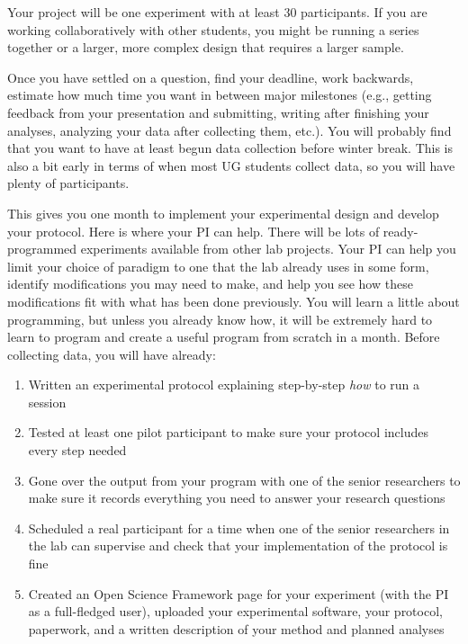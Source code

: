 \documentclass[12pt,]{book}
\providecommand{\tightlist}{%
  \setlength{\itemsep}{0pt}\setlength{\parskip}{0pt}}
\theoremstyle{definition}
\theoremstyle{definition}
\theoremstyle{definition}
\theoremstyle{remark}
\begin{document}
Your project will be one experiment with at least 30 participants. If
you are working collaboratively with other students, you might be
running a series together or a larger, more complex design that requires
a larger sample.

Once you have settled on a question, find your deadline, work backwards,
estimate how much time you want in between major milestones (e.g.,
getting feedback from your presentation and submitting, writing after
finishing your analyses, analyzing your data after collecting them,
etc.). You will probably find that you want to have at least begun data
collection before winter break. This is also a bit early in terms of
when most UG students collect data, so you will have plenty of
participants.

This gives you one month to implement your experimental design and
develop your protocol. Here is where your PI can help. There will be
lots of ready-programmed experiments available from other lab projects.
Your PI can help you limit your choice of paradigm to one that the lab
already uses in some form, identify modifications you may need to make,
and help you see how these modifications fit with what has been done
previously. You will learn a little about programming, but unless you
already know how, it will be extremely hard to learn to program and
create a useful program from scratch in a month. Before collecting data,
you will have already:

\begin{enumerate}
\def\labelenumi{\arabic{enumi}.}
\tightlist
\item
  Written an experimental protocol explaining step-by-step \emph{how} to
  run a session
\item
  Tested at least one pilot participant to make sure your protocol
  includes every step needed
\item
  Gone over the output from your program with one of the senior
  researchers to make sure it records everything you need to answer your
  research questions
\item
  Scheduled a real participant for a time when one of the senior
  researchers in the lab can supervise and check that your
  implementation of the protocol is fine
\item
  Created an Open Science Framework page for your experiment (with the
  PI as a full-fledged user), uploaded your experimental software, your
  protocol, paperwork, and a written description of your method and
  planned analyses
\end{enumerate}
\end{document}
